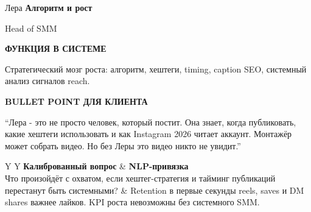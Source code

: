 \documentclass[11pt,a4paper]{article}
\newcommand{\minititle}[1]{{\sansfont\bfseries\fontsize{9.5}{11}\selectfont\color{rose}\MakeUppercase{#1}}}
\begin{document}
\begin{glassbox}
{\headingfont\fontsize{18}{20}\selectfont Лера}\hfill
{\sansfont\bfseries\color{emerald} Алгоритм и рост}

{\color{muted} Head of SMM}

\vspace{2mm}
\begin{softbox}[colback=paperbg]
\minititle{Функция в системе}\par
Стратегический мозг роста: алгоритм, хештеги, timing, caption SEO, системный анализ сигналов reach.
\end{softbox}
\vspace{2mm}
\begin{softbox}[colback=paperbg]
\minititle{Bullet Point для клиента}\par
``Лера - это не просто человек, который постит. Она знает, когда публиковать, какие хештеги использовать и как Instagram 2026 читает аккаунт. Монтажёр может собрать видео. Но без Леры это видео никто не увидит.''
\end{softbox}
\vspace{2mm}
\begin{tabularx}{\linewidth}{Y Y}
\textbf{Калиброванный вопрос} & \textbf{NLP-привязка} \\
Что произойдёт с охватом, если хештег-стратегия и тайминг публикаций перестанут быть системными? & Retention в первые секунды reels, saves и DM shares важнее лайков. KPI роста невозможны без системного SMM. \\
\end{tabularx}
\end{glassbox}

\vspace{3mm}
\end{document}
